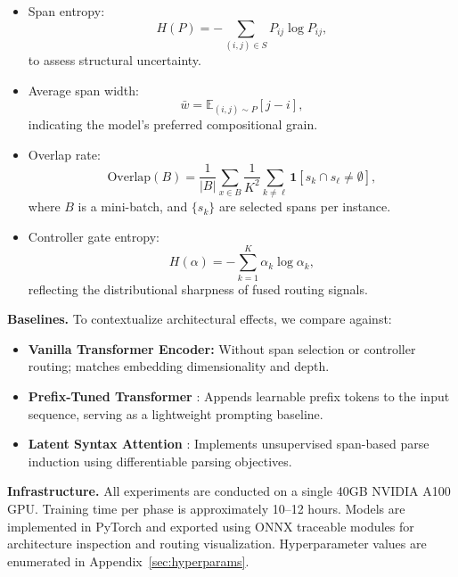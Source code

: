 \begin{itemize}[leftmargin=1.5em]
  \item Span entropy:
  \begin{equation}
  H(P) = -\sum_{(i,j) \in S} P_{ij} \log P_{ij},
  \end{equation}
  to assess structural uncertainty.
  
  \item Average span width:
  \begin{equation}
  \bar{w} = \mathbb{E}_{(i,j) \sim P} [j - i],
  \end{equation}
  indicating the model’s preferred compositional grain.
  
  \item Overlap rate:
  \[
  \text{Overlap}(B) = \frac{1}{|B|} \sum_{x \in B} \frac{1}{K^2} \sum_{k \neq \ell} \mathbf{1}[s_k \cap s_\ell \neq \emptyset],
  \]
  where \(B\) is a mini-batch, and \(\{s_k\}\) are selected spans per instance.
  
  \item Controller gate entropy:
  \[
  H(\alpha) = -\sum_{k=1}^K \alpha_k \log \alpha_k,
  \]
  reflecting the distributional sharpness of fused routing signals.
\end{itemize}

\vspace{0.5em}
\noindent\textbf{Baselines.} To contextualize architectural effects, we compare against:

\begin{itemize}[leftmargin=1.5em]
  \item \textbf{Vanilla Transformer Encoder:} Without span selection or controller routing; matches embedding dimensionality and depth.
  
  \item \textbf{Prefix-Tuned Transformer} \cite{li2021prefix}: Appends learnable prefix tokens to the input sequence, serving as a lightweight prompting baseline.
  
  \item \textbf{Latent Syntax Attention} \cite{kim2019unsupervised}: Implements unsupervised span-based parse induction using differentiable parsing objectives.
\end{itemize}

\vspace{0.5em}
\noindent\textbf{Infrastructure.} All experiments are conducted on a single 40GB NVIDIA A100 GPU. Training time per phase is approximately 10–12 hours. Models are implemented in PyTorch and exported using ONNX traceable modules for architecture inspection and routing visualization. Hyperparameter values are enumerated in Appendix~\ref{sec:hyperparams}.








